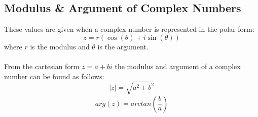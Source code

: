 \documentclass{article}
\begin{document}
                \subsection{Modulus \& Argument of Complex Numbers}
                	These values are given when a complex number is represented in the polar form:
                	\[z=r\left(\cos\left(\theta\right) + i\sin\left(\theta\right)\right)\]
                	where \(r\) is the modulus and \(\theta\) is the argument. \\\\
                	From the cartesian form \(z=a+bi\) the modulus and argument of a complex number can be found as follows:
                	\[|z|=\sqrt{a^2 + b^2}\]
                	\[arg\left(z\right) = arctan\left(\frac{b}{a}\right)\]
\end{document}
